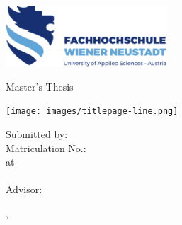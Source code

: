 
\makeatletter

\begin{titlepage}

	\includegraphics[width=6cm]{images/fhwn-logo-neu-ohneSchutzraum.png}

	\begin{sffamily}
		\vspace{70pt}
		{\noindent \linespread{1.3} \color{header-blue} \Huge \textbf{\@title} \par }
		\vspace{5pt}
		{\noindent\Large Master's Thesis \par}
		\vspace{20pt}

		\hspace{-35mm}
		\texttt{[image: images/titlepage-line.png]}

		\vspace{15pt}

		\tabto{2cm}Submitted by: \tabto{7cm}\textbf{\@author} \\
		\tabto{2cm}Matriculation No.: \tabto{7cm}\textbf{\matriculationNumber} \\
		\vspace{15pt}
		\tabto{2cm}at \tabto{7cm}\textbf{\study}\\
		\tabto{7cm}\textbf{\studyprogram} \\
		\vspace{15pt}
		\tabto{2cm}Advisor: \tabto{7cm}\textbf{\advisor}

		\vfill

		\place, \thesisdate
	\end{sffamily}
\end{titlepage}
\makeatother


